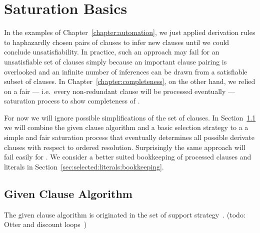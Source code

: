




\section{Saturation Basics}\label{sec:saturation:basics}

In the examples of Chapter~\ref{chapter:automation},
we just applied derivation rules
to haphazardly chosen pairs of clauses
to infer new clauses
until we could conclude unsatisfiability.
%
In practice, such an approach may fail for an unsatisfiable set of clauses
simply because an important clause pairing is overlooked
and an infinite number of inferences can be drawn
from a satisfiable subset of clauses.
%
In Chapter~\ref{chapter:completeness}, on the other hand,
we relied on a fair ---
i.e.\ every non-redundant clause will be processed eventually ---
saturation process to show completeness of \InstGenEQ{}.

For now we will ignore possible simplifications of the set of clauses.
In Section~\ref{sec:given:clause:algorithm}
we will combine the given clause algorithm
and a basic selection strategy to a a simple and fair saturation process
that eventually determines all possible derivate clauses
with respect to ordered resolution.
Surprisingly the same approach will fail easily for \InstGen{}.
We consider a better suited bookkeeping of processed clauses and literals
in Section~\ref{sec:selected:literals:bookkeeping}.



\subsection{Given Clause Algorithm}\label{sec:given:clause:algorithm}

The given clause algorithm is originated in the set of support strategy~\cite{Wos:1965:ECS:321296.321302}. (todo: Otter and discount loops~\cite{DBLP:conf/cade/SchulzM16})

